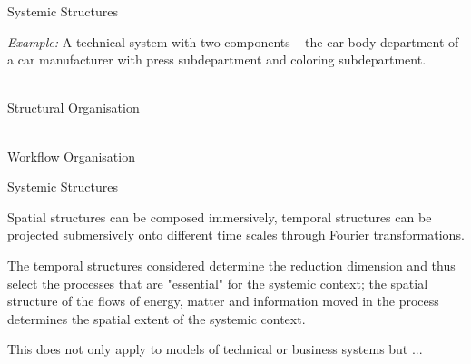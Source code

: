 \documentclass{beamer}
\begin{document}
\begin{frame}{Systemic Structures}

  \emph{Example:} A technical system with two components -- the car body
  department of a car manufacturer with press subdepartment and coloring
  subdepartment.
    
  \begin{minipage}{.42\textwidth}\centering\vspace*{2em}
    \\[2em] Structural Organisation
  \end{minipage}\hfill
  \begin{minipage}{.55\textwidth}\centering
    \\[2em] Workflow Organisation
  \end{minipage}
\end{frame}

\begin{frame}{Systemic Structures}

Spatial structures can be composed immersively, temporal structures can be
projected submersively onto different time scales through Fourier
transformations.

The temporal structures considered determine the reduction dimension and thus
select the processes that are "essential" for the systemic context; the
spatial structure of the flows of energy, matter and information moved in the
process determines the spatial extent of the systemic context.

This does not only apply to models of technical or business systems but ...
\end{frame}
\end{document}
